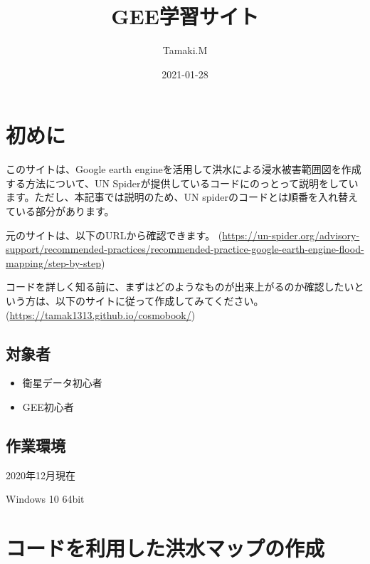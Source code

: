 \documentclass[
]{book}
\title{GEE学習サイト}
\author{Tamaki.M}
\date{2021-01-28}
\begin{document}
\maketitle

{
\setcounter{tocdepth}{1}
\tableofcontents
}
\hypertarget{ux521dux3081ux306b}{%
\chapter*{初めに}\label{ux521dux3081ux306b}}

このサイトは、Google earth engineを活用して洪水による浸水被害範囲図を作成する方法について、UN Spiderが提供しているコードにのっとって説明をしています。ただし、本記事では説明のため、UN spiderのコードとは順番を入れ替えている部分があります。

元のサイトは、以下のURLから確認できます。
(\url{https://un-spider.org/advisory-support/recommended-practices/recommended-practice-google-earth-engine-flood-mapping/step-by-step})

コードを詳しく知る前に、まずはどのようなものが出来上がるのか確認したいという方は、以下のサイトに従って作成してみてください。
(\url{https://tamak1313.github.io/cosmobook/})

\hypertarget{ux5bfeux8c61ux8005}{%
\section{対象者}\label{ux5bfeux8c61ux8005}}

\begin{itemize}
\item
  衛星データ初心者
\item
  GEE初心者
\end{itemize}

\hypertarget{ux4f5cux696dux74b0ux5883}{%
\section{作業環境}\label{ux4f5cux696dux74b0ux5883}}

2020年12月現在

Windows 10 64bit

\hypertarget{ux30b3ux30fcux30c9ux3092ux5229ux7528ux3057ux305fux6d2aux6c34ux30deux30c3ux30d7ux306eux4f5cux6210}{%
\chapter{コードを利用した洪水マップの作成}\label{ux30b3ux30fcux30c9ux3092ux5229ux7528ux3057ux305fux6d2aux6c34ux30deux30c3ux30d7ux306eux4f5cux6210}}
\end{document}
